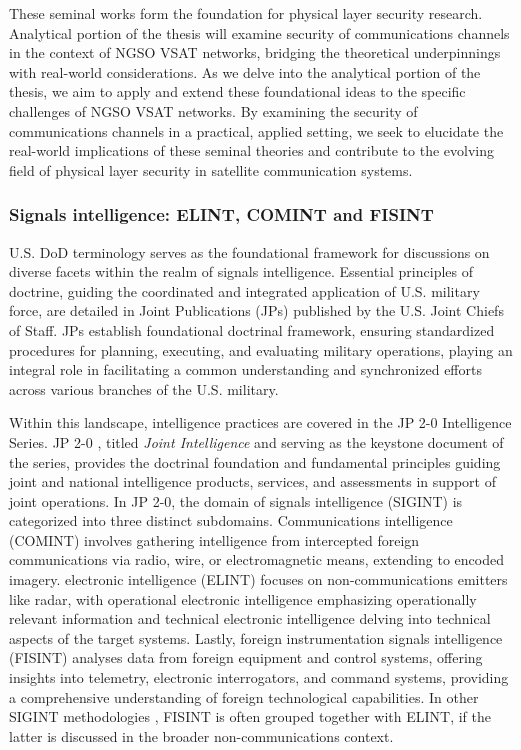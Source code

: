 \documentclass[english, 12pt, a4paper, elec, utf8, a-1b, online]{aaltothesis}
\begin{document}
These seminal works form the foundation for physical layer security research.
Analytical portion of the thesis will examine security of communications channels in the context of NGSO VSAT networks, bridging the theoretical underpinnings with real-world considerations.
As we delve into the analytical portion of the thesis, we aim to apply and extend these foundational ideas to the specific challenges of NGSO VSAT networks.
By examining the security of communications channels in a practical, applied setting, we seek to elucidate the real-world implications of these seminal theories and contribute to the evolving field of physical layer security in satellite communication systems.


\subsubsection{Signals intelligence: ELINT, COMINT and FISINT}
U.S. DoD terminology serves as the foundational framework for discussions on diverse facets within the realm of signals intelligence.
Essential principles of doctrine, guiding the coordinated and integrated application of U.S. military force, are detailed in Joint Publications (JPs) published by the U.S. Joint Chiefs of Staff.
JPs establish foundational doctrinal framework, ensuring standardized procedures for planning, executing, and evaluating military operations, playing an integral role in facilitating a common understanding and synchronized efforts across various branches of the U.S. military.

Within this landscape, intelligence practices are covered in the JP 2-0 Intelligence Series.
JP 2-0 \cite{jp2-0}, titled \textit{Joint Intelligence} and serving as the keystone document of the series, provides the doctrinal foundation and fundamental principles guiding joint and national intelligence products, services, and assessments in support of joint operations.
In JP 2-0, the domain of signals intelligence (SIGINT) is categorized into three distinct subdomains. Communications intelligence (COMINT) involves gathering intelligence from intercepted foreign communications via radio, wire, or electromagnetic means, extending to encoded imagery.
electronic intelligence (ELINT) focuses on non-communications emitters like radar, with operational electronic intelligence emphasizing operationally relevant information and technical electronic intelligence delving into technical aspects of the target systems.
Lastly, foreign instrumentation signals intelligence (FISINT) analyses data from foreign equipment and control systems, offering insights into telemetry, electronic interrogators, and command systems, providing a comprehensive understanding of foreign technological capabilities.
In other SIGINT methodologies \cite{kosola2013digitaalinen}, FISINT is often grouped together with ELINT, if the latter is discussed in the broader non-communications context.
\end{document}
